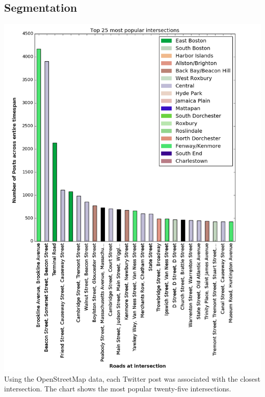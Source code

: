 \documentclass{lposter}
\theoremstyle{plain}
\theoremstyle{definition}
\begin{document}
\begin{poster}
\section{Segmentation}
\includegraphics[scale=0.58]{popularintersections.png}
Using the OpenStreetMap data, each Twitter post was associated with the closest intersection. The chart shows the most popular twenty-five intersections. 


\end{poster}
\end{document}
